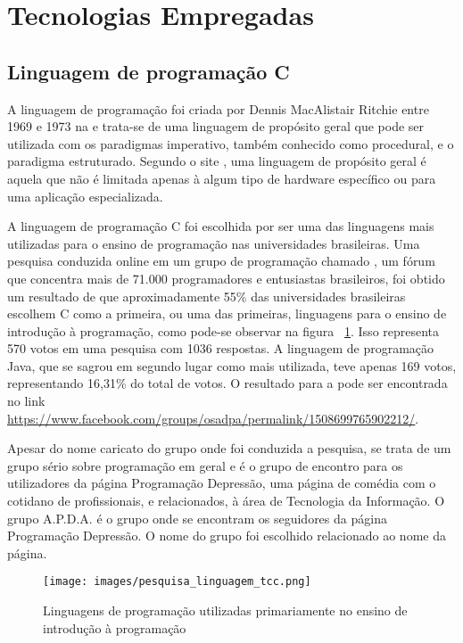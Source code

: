 \documentclass[12pt, %
openright,
oneside, %
a4paper,    %
brazil]{facom-ufu-abntex2}
\begin{document}
\section{Tecnologias Empregadas}

\subsection{Linguagem de programação C}
A linguagem de programação  foi criada por Dennis MacAlistair Ritchie entre 1969 e 1973 na  e trata-se de uma linguagem de propósito geral que pode ser utilizada com os paradigmas imperativo, também conhecido como procedural, e o paradigma estruturado. Segundo o site , uma linguagem de propósito geral é aquela que não é limitada apenas à algum tipo de hardware específico ou para uma aplicação especializada.

A linguagem de programação C foi escolhida por ser uma das linguagens mais utilizadas para o ensino de programação nas universidades brasileiras. Uma pesquisa conduzida online em um grupo de programação chamado , um fórum que concentra mais de 71.000 programadores e entusiastas brasileiros, foi obtido um resultado de que aproximadamente 55\% das universidades brasileiras escolhem C como a primeira, ou uma das primeiras, linguagens para o ensino de introdução à programação, como pode-se observar na figura ~\ref{fig:pesquisa_linguagem_tcc}. Isso representa 570 votos em uma pesquisa com 1036 respostas. A linguagem de programação Java, que se sagrou em segundo lugar como mais utilizada, teve apenas 169 votos, representando 16,31\% do total de votos. O resultado para a  pode ser encontrada no link \hyperref[https://www.facebook.com/groups/osadpa/permalink/1508699765902212/]{https://www.facebook.com/groups/osadpa/permalink/1508699765902212/}.

Apesar do nome caricato do grupo onde foi conduzida a pesquisa, se trata de um grupo sério sobre programação em geral e é o grupo de encontro para os utilizadores da página Programação Depressão, uma página de comédia com o cotidano de profissionais, e relacionados, à área de Tecnologia da Informação. O grupo A.P.D.A. é o grupo onde se encontram os seguidores da página Programação Depressão. O nome do grupo foi escolhido relacionado ao nome da página.

\pagebreak
\begin{figure}[htbp]
  \centering
  \texttt{[image: images/pesquisa\_linguagem\_tcc.png]}
  \caption{Linguagens de programação utilizadas primariamente no ensino de introdução à programação}
  \label{fig:pesquisa_linguagem_tcc}
\end{figure}
\end{document}
